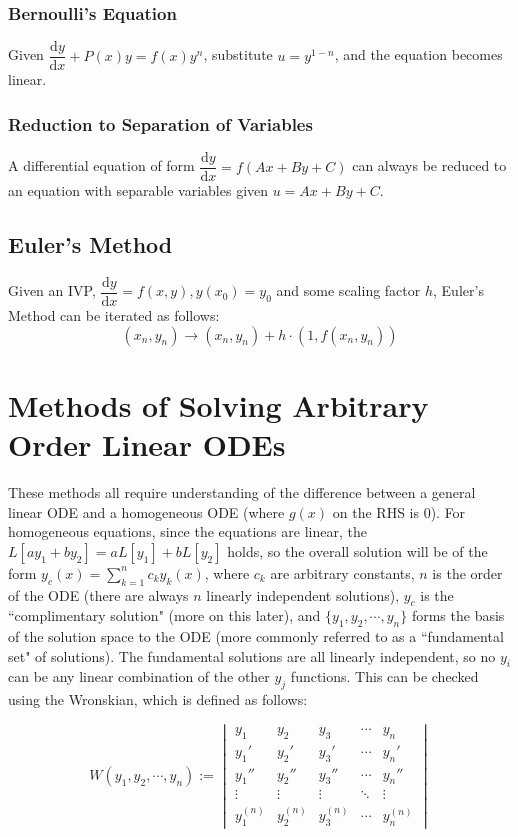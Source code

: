 \documentclass[12pt]{article}
\newcommand \dstyle \displaystyle
\renewcommand \d [1] {\mathrm{d}{#1}}
\newcommand \dx {{\d x}}
\newcommand \dy {{\d y}}
\newcommand \dydx {\dfrac \dy\dx}
\begin{document}
\subsubsection{Bernoulli's Equation}

Given $\dydx + P(x) y = f(x) y^n$, substitute $u = y^{1 - n}$, and the equation becomes linear.

\subsubsection{Reduction to Separation of Variables}

A differential equation of form $\dydx = f(Ax + By + C)$ can always be reduced to an equation with separable variables given $u = Ax + By + C$.

\subsection{Euler's Method}

Given an IVP, $\dydx = f(x, y), y(x_0) = y_0$ and some scaling factor $h$, Euler's Method can be iterated as follows:
\begin{equation}
	(x_n, y_n) \to (x_n, y_n) + h \cdot (1, f(x_n, y_n))
\end{equation}

\section{Methods of Solving Arbitrary Order Linear ODEs}

These methods all require understanding of the difference between a general linear ODE and a homogeneous ODE (where $g(x)$ on the RHS is 0). For homogeneous equations, since the equations are linear, the $L[a y_1 + b y_2] = a L[y_1] + b L[y_2]$ holds, so the overall solution will be of the form $\dstyle y_c(x) = \sum_{k=1}^n c_k y_k(x)$, where $c_k$ are arbitrary constants, $n$ is the order of the ODE (there are always $n$ linearly independent solutions), $y_c$ is the ``complimentary solution" (more on this later), and $\{y_1, y_2, \cdots, y_n\}$ forms the basis of the solution space to the ODE (more commonly referred to as a ``fundamental set" of solutions). The fundamental solutions are all linearly independent, so no $y_i$ can be any linear combination of the other $y_j$ functions. This can be checked using the Wronskian, which is defined as follows:

\begin{equation}
	W(y_1, y_2, \cdots \!, y_n) := \begin{vmatrix}
		y_1 & y_2 & y_3 & \cdots & y_n \\
		y_1' & y_2' & y_3' & \cdots & y_n' \\
		y_1'' & y_2''& y_3'' & \cdots & y_n'' \\
		\vdots & \vdots	& \vdots & \ddots & \vdots \\
		y_1^{(n)} & y_2^{(n)} & y_3^{(n)} & \cdots & y_n^{(n)}
	\end{vmatrix}
\end{equation}
\end{document}
